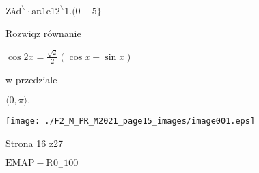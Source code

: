 \documentclass[a4paper,12pt]{article}
\begin{document}
$\mathrm{Z}\text{à} \mathrm{d}^{\backslash }\cdot \mathrm{a}\mathfrak{n}1\mathrm{e}12^{\backslash }1.(0-5\}$

Rozwiqz równanie

$\cos 2x =\displaystyle \frac{\sqrt{2}}{2}(\cos x-\sin x)$

w przedziale

$\langle 0, \pi\rangle.$
\begin{center}
\texttt{[image: ./F2\_M\_PR\_M2021\_page15\_images/image001.eps]}
\end{center}
Strona 16 z27

$\mathrm{E}\mathrm{M}\mathrm{A}\mathrm{P}-\mathrm{R}0_{-}100$
\end{document}
